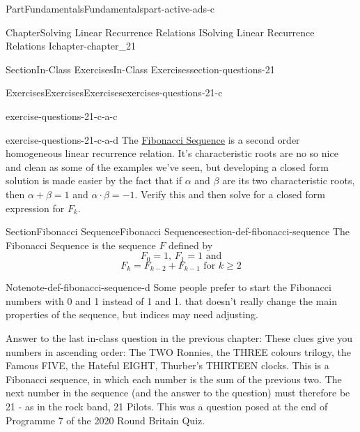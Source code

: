 \documentclass[oneside,10pt,]{book}
\numberwithin{equation}{section}
\begin{document}
\begin{partptx}{Part}{Fundamentals}{}{Fundamentals}{}{}{part-active-ads-c}
\begin{chapterptx}{Chapter}{Solving Linear Recurrence Relations I}{}{Solving Linear Recurrence Relations I}{}{}{chapter-chapter_21}
\begin{sectionptx}{Section}{In-Class Exercises}{}{In-Class Exercises}{}{}{section-questions-21}
\begin{exercises-subsection-numberless}{Exercises}{Exercises}{}{Exercises}{}{}{exercises-questions-21-c}
\begin{exercisegroup}
\begin{divisionexerciseeg}{3}{}{}{exercise-questions-21-c-a-c}
\end{divisionexerciseeg}%
\begin{divisionexerciseeg}{4}{}{}{exercise-questions-21-c-a-d}%
The \hyperref[section-def-fibonacci-sequence]{Fibonacci Sequence}  is a second order homogeneous linear recurrence relation. It's characteristic roots are no so nice and clean as some of the examples we've seen, but developing a closed form solution is made easier by the fact that if \(\alpha\) and \(\beta\) are its two characteristic roots, then \(\alpha + \beta = 1\) and \(\alpha \cdot \beta =-1\).  Verify this and then solve for a closed form expression for \(F_k\).%
\end{divisionexerciseeg}%
\end{exercisegroup}
\par\medskip\noindent
\end{exercises-subsection-numberless}
\end{sectionptx}
%
%
\typeout{************************************************}
\typeout{************************************************}
%
\begin{sectionptx}{Section}{Fibonacci Sequence}{}{Fibonacci Sequence}{}{}{section-def-fibonacci-sequence}
%
The Fibonacci Sequence is the sequence \(F\) defined by%
\begin{equation*}
F_0= 1 \textrm{, } F_1= 1\textrm{ and}
\end{equation*}
%
\begin{equation*}
F_k = F_{k-2} + F_{k-1} \textrm{ for }k\geq 2
\end{equation*}
%
\begin{note}{Note}{}{note-def-fibonacci-sequence-d}%
Some people prefer to start the Fibonacci numbers with 0 and 1 instead of 1 and 1.  that doesn't really change the main properties of the sequence, but indices may need adjusting.%
\end{note}
Answer to the last in-class question in the previous chapter: These clues give you numbers in ascending order: The TWO Ronnies, the THREE colours trilogy, the Famous FIVE, the Hateful EIGHT, Thurber's THIRTEEN clocks. This is a Fibonacci sequence, in which each number is the sum of the previous two. The next number in the sequence (and the answer to the question) must therefore be 21 - as in the rock band, 21 Pilots. This was a question posed at the end of Programme 7 of the 2020 Round Britain Quiz.%
\end{sectionptx}
\end{chapterptx}

\end{partptx}
\end{document}
